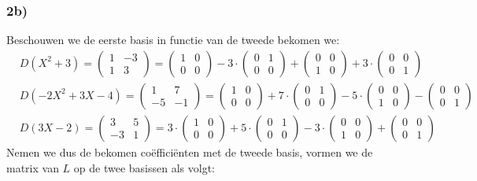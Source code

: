 \documentclass[lineaire_algebra_oplossingen.tex]{subfiles}
\begin{document}
\subsubsection*{2b)}
Beschouwen we de eerste basis in functie van de tweede bekomen we:
\begin{align*}
&D(X^2+3)
= \begin{pmatrix}1&-3\\ 1&3\end{pmatrix}
=         \begin{pmatrix} 1 & 0 \\ 0 & 0 \end{pmatrix}
- 3 \cdot \begin{pmatrix} 0 & 1 \\ 0 & 0 \end{pmatrix}
+         \begin{pmatrix} 0 & 0 \\ 1 & 0 \end{pmatrix}
+ 3 \cdot \begin{pmatrix} 0 & 0 \\ 0 & 1 \end{pmatrix} \\
&D(-2X^2+3X-4)
= \begin{pmatrix}1&7\\ -5&-1\end{pmatrix}
=         \begin{pmatrix} 1 & 0 \\ 0 & 0 \end{pmatrix}
+ 7 \cdot \begin{pmatrix} 0 & 1 \\ 0 & 0 \end{pmatrix}
- 5 \cdot \begin{pmatrix} 0 & 0 \\ 1 & 0 \end{pmatrix}
-         \begin{pmatrix} 0 & 0 \\ 0 & 1 \end{pmatrix} \\
&D(3X-2)
= \begin{pmatrix}3&5\\ -3&1\end{pmatrix}
= 3 \cdot \begin{pmatrix} 1 & 0 \\ 0 & 0 \end{pmatrix}
+ 5 \cdot \begin{pmatrix} 0 & 1 \\ 0 & 0 \end{pmatrix}
- 3 \cdot \begin{pmatrix} 0 & 0 \\ 1 & 0 \end{pmatrix}
+         \begin{pmatrix} 0 & 0 \\ 0 & 1 \end{pmatrix}
\end{align*}
Nemen we dus de bekomen co\"effici\"enten met de tweede basis, vormen we de matrix van $L$ op de twee basissen als volgt:\\
\end{document}
